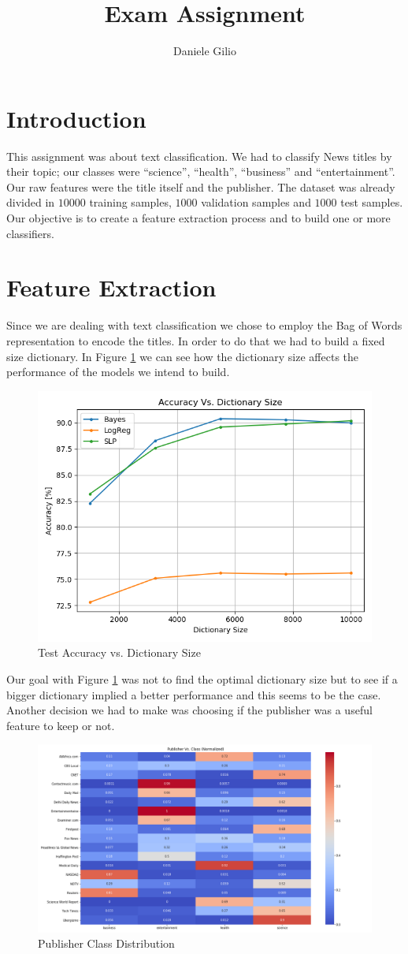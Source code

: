 \documentclass[10pt,a4paper]{report}
\author{Daniele Gilio}
\title{Exam Assignment}
\begin{document}
\maketitle
\section{Introduction}
This assignment was about text classification. We had to classify News titles by their topic; our classes were \enquote{science}, \enquote{health}, \enquote{business} and \enquote{entertainment}. Our raw features were the title itself and the publisher. The dataset was already divided in $10000$ training samples, $1000$ validation samples and $1000$ test samples. Our objective is to create a feature extraction process and to build one or more classifiers.
\section{Feature Extraction}
Since we are dealing with text classification we chose to employ the Bag of Words representation to encode the titles. In order to do that we had to build a fixed size dictionary. In Figure \ref{fig:acc_vs_dic} we can see how the dictionary size affects the performance of the models we intend to build.
\begin{figure}[!ht]
\centering
\includegraphics[width=0.5\linewidth]{acc_vs_dic.png}
\caption{Test Accuracy vs. Dictionary Size}
\label{fig:acc_vs_dic}
\end{figure}
Our goal with Figure \ref{fig:acc_vs_dic} was not to find the optimal dictionary size but to see if a bigger dictionary implied a better performance and this seems to be the case. Another decision we had to make was choosing if the publisher was a useful feature to keep or not. 
\begin{figure}[!ht]
\centering
\includegraphics[width=0.8\linewidth]{pub_vs_class.png}
\caption{Publisher Class Distribution}
\label{fig:pub_vs_class}
\end{figure}
\end{document}
